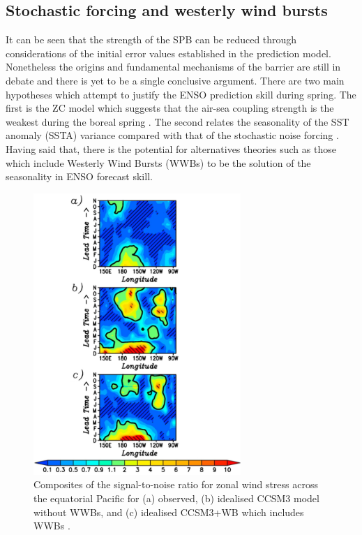 \documentclass[12pt, onecolumn]{revtex4}    %
\begin{document}

\subsection{Stochastic forcing and westerly wind bursts}

It can be seen that the strength of the SPB can be reduced through considerations of the initial error values established in the prediction model. Nonetheless the origins and fundamental mechanisms of the barrier are still in debate and there is yet to be a single conclusive argument. There are two main hypotheses which attempt to justify the ENSO prediction skill during spring. The first is the ZC model which suggests that the air-sea coupling strength is the weakest during the boreal spring \citep{Zebiak:1987aa}. The second relates the seasonality of the SST anomaly (SSTA) variance compared with that of the stochastic noise forcing \citep{webster1992monsoon, xue1994prediction}. Having said that, there is the potential for alternatives theories such as those which include Westerly Wind Bursts (WWBs) to be the solution of the seasonality in ENSO forecast skill. \\

\begin{figure}
\includegraphics[width=0.7\textwidth]{data/wwbs}
\caption[WWBs]{Composites of the signal-to-noise ratio for zonal wind stress across the equatorial Pacific for (a) observed, (b) idealised CCSM3 model without WWBs, and (c) idealised CCSM3+WB which includes WWBs \citep{lopez2014wwbs}.}
\label{fig:wwbs}
\end{figure}
\end{document}
